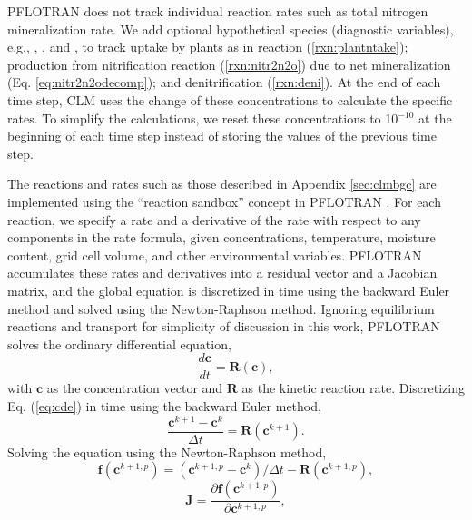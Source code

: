 \documentclass[gmd, manuscript]{copernicus}
\begin{document}
PFLOTRAN does not track individual reaction rates such as total nitrogen
mineralization rate. We add optional hypothetical species (diagnostic variables), e.g.,
, , and , to track   uptake by
plants as in reaction (\ref{rxn:plantntake});  production from
nitrification reaction (\ref{rxn:nitr2n2o}) due to net mineralization (Eq.
\ref{eq:nitr2n2odecomp}); and denitrification (\ref{rxn:deni}).
At the end of each time step, CLM uses the change of these
concentrations to calculate the specific rates. To simplify the calculations, we
reset these concentrations to 10$^{-10}$ at the beginning of each time step
instead of storing the values of the previous time step. 

The reactions and rates such as those described in Appendix \ref{sec:clmbgc}
are implemented using the ``reaction sandbox'' concept in PFLOTRAN
\citep{Lichtner2015}. For each reaction, we specify a rate and a derivative of
the rate with respect to any components in the rate formula, given
concentrations, temperature, moisture content, grid cell volume, and other
environmental variables. PFLOTRAN accumulates these rates and derivatives into
a residual vector and a Jacobian matrix, and the global equation is discretized
in time using the backward Euler method and solved using the Newton-Raphson
method.
Ignoring equilibrium reactions and transport for simplicity of discussion in
this work, PFLOTRAN solves the ordinary differential equation,
\begin{equation}
\label{eq:cde}
\frac{d \mathbf{c}}{d t} = \mathbf{R}(\mathbf{c}),
\end{equation}
with $\mathbf{c}$ as the concentration vector and $\mathbf{R}$ as the kinetic reaction rate. 
Discretizing Eq. (\ref{eq:cde}) in time using the backward Euler method, 
\begin{equation}
\frac{\mathbf{c}^{k+1} - \mathbf{c}^k}{\Delta t} = \mathbf{R}(\mathbf{c}^{k+1}).
\label{eq:cdedis}
\end{equation}
Solving the equation  using the Newton-Raphson method,
\begin{equation}
\mathbf{f}(\mathbf{c}^{k+1,p} )=(\mathbf{c}^{k+1,p}-\mathbf{c}^k)/\Delta t-\mathbf{R}(\mathbf{c}^{k+1,p}),
\label{eq:residual}
\end{equation}
\begin{equation}
\mathbf{J} = \frac{\partial \mathbf{f}(\mathbf{c}^{k+1,p})}{\partial \mathbf{c}^{k+1,p}},
\label{eq:jacobian}
\end{equation}
\end{document}
